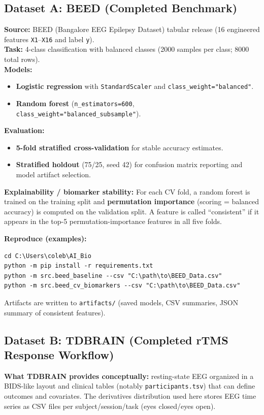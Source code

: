 \documentclass[11pt]{article}
\begin{document}
\subsection{Dataset A: BEED (Completed Benchmark)}
\textbf{Source:} BEED (Bangalore EEG Epilepsy Dataset) tabular release (16 engineered features \texttt{X1}--\texttt{X16} and label \texttt{y}).\\
\textbf{Task:} 4-class classification with balanced classes (2000 samples per class; 8000 total rows).\\
\textbf{Models:}
\begin{itemize}
  \item \textbf{Logistic regression} with \texttt{StandardScaler} and \texttt{class\_weight="balanced"}.
  \item \textbf{Random forest} (\texttt{n\_estimators=600}, \texttt{class\_weight="balanced\_subsample"}).
\end{itemize}
\textbf{Evaluation:}
\begin{itemize}
  \item \textbf{5-fold stratified cross-validation} for stable accuracy estimates.
  \item \textbf{Stratified holdout} (75/25, seed 42) for confusion matrix reporting and model artifact selection.
\end{itemize}
\textbf{Explainability / biomarker stability:} For each CV fold, a random forest is trained on the training split and \textbf{permutation importance} (scoring = balanced accuracy) is computed on the validation split. A feature is called ``consistent'' if it appears in the top-5 permutation-importance features in all five folds.

\textbf{Reproduce (examples):}
\begin{verbatim}
cd C:\Users\coleb\AI_Bio
python -m pip install -r requirements.txt
python -m src.beed_baseline --csv "C:\path\to\BEED_Data.csv"
python -m src.beed_cv_biomarkers --csv "C:\path\to\BEED_Data.csv"
\end{verbatim}
Artifacts are written to \texttt{artifacts/} (saved models, CSV summaries, JSON summary of consistent features).

\subsection{Dataset B: TDBRAIN (Completed rTMS Response Workflow)}
\textbf{What TDBRAIN provides conceptually:} resting-state EEG organized in a BIDS-like layout and clinical tables (notably \texttt{participants.tsv}) that can define outcomes and covariates. The derivatives distribution used here stores EEG time series as CSV files per subject/session/task (eyes closed/eyes open).
\end{document}

